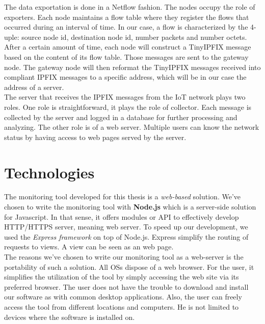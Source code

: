 The data exportation is done in a Netflow fashion. The nodes occupy the role of exporters. Each node maintains a flow table where they register the flows that occurred during an interval of time. In our case, a flow is characterized by the 4-uple: source node id, destination node id, number packets and number octets. After a certain amount of time, each node will construct a TinyIPFIX message based on the content of its flow table. Those messages are sent to the gateway node. The gateway node will then reformat the TinyIPFIX messages received into compliant IPFIX messages to a specific address, which will be in our case the address of a server.\\

The server that receives the IPFIX messages from the IoT network plays two roles. One role is straightforward, it plays the role of collector. Each message is collected by the server and logged in a database for further processing and analyzing. The other role is of a web server. Multiple users can know the network status by having access to web pages served by the server.

\section{Technologies}

The monitoring tool developed for this thesis is a \textit{web-based} solution. We've chosen to write the monitoring tool with \textbf{Node.js} \cite{website:nodejs} which is a server-side solution for Javascript. In that sense, it offers modules or API to effectively develop HTTP/HTTPS server, meaning web server. To speed up our development, we used the \textit{Express framework} \cite{website:express} on top of Node.js. Express simplify the routing of requests to views. A view can be seen as an web page. \\

The reasons we've chosen to write our monitoring tool as a web-server is the portability of such a solution. All OSs dispose of a web browser. For the user, it simplifies the utilization of the tool by simply accessing the web site via its preferred browser. The user does not have the trouble to download and install our software as with common desktop applications. Also, the user can freely access the tool from different locations and computers. He is not limited to devices where the software is installed on. \\

